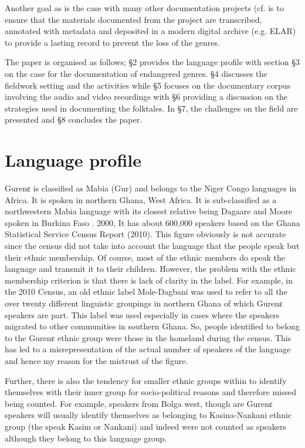 \documentclass[output=paper,colorlinks,citecolor=brown]{langscibook}
\begin{document}
Another goal as is the case with many other documentation projects (cf. \cite{TrilsbeekWittenburg2006, Austin2003, Austin2006, Himmelmann1998, HimmelmannEtAl2006} is to ensure that the materials documented from the project are transcribed, annotated with metadata and deposited in a modern digital archive (e.g. ELAR) to provide a lasting record to prevent the loss of the genres. 

The paper is organised as follows; §2 provides the language profile with section §3 on the case for the documentation of endangered genres. §4 discusses the fieldwork setting and the activities while §5 focuses on the documentary corpus involving the audio and video recordings with §6 providing a discussion on the strategies used in documenting the folktales. In §7, the challenges on the field are presented and §8 concludes the paper. 

\section{Language profile}
Gurenɛ is classified as Mabia (Gur) and belongs to the Niger Congo languages in Africa. It is spoken in northern Ghana, West Africa. It is sub-classified as a northwestern Mabia language with its closest relative being Dagaare and Moore spoken in Burkina Faso \citep{Naden1989, Bendor-SamuelHartell1989, Bodomo1994, Bodomo2004, Bodomo2020}.  2000,  It has about 600,000 speakers based on the Ghana Statistical Service Census Report (2010). This figure obviously is not accurate since the census did not take into account the language that the people speak but their ethnic membership. Of course, most of the ethnic members do speak the language and transmit it to their children. However, the problem with the ethnic membership criterion is that there is lack of clarity in the label. For example, in the 2010 Census, an old ethnic label Mole-Dagbani was used to refer to all the over twenty different linguistic groupings in northern Ghana of which Gurenɛ speakers are part. This label was used especially in cases where the speakers migrated to other communities in southern Ghana. So, people identified to belong to the Gurenɛ ethnic group were those in the homeland during the census. This has led to a misrepresentation of the actual number of speakers of the language and hence my reason for the mistrust of the figure.

Further, there is also the tendency for smaller ethnic groups within to identify themselves with their inner group for socio-political reasons and therefore missed being counted. For example, speakers from Bolga west, though are Gurenɛ speakers will usually identify themselves as belonging to Kasina-Nankani ethnic group (the speak Kasim or Nankani) and indeed were not counted as speakers although they belong to this language group. 
\end{document}
